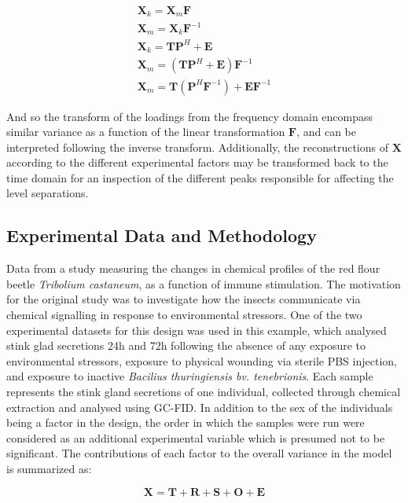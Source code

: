 \documentclass[preprint,12pt]{elsarticle}
\begin{document}
\begin{align}
    \mathbf{X}_k = \mathbf{X}_m\mathbf{F}\\
    \mathbf{X}_m = \mathbf{X}_k\mathbf{F}^{-1}\\
    \mathbf{X}_k = \mathbf{T}\mathbf{P}^H + \mathbf{E}\\
    \mathbf{X}_m = \left(\mathbf{T}\mathbf{P}^H + \mathbf{E}\right)\mathbf{F}^{-1}\\
    \mathbf{X}_m = \mathbf{T}\left(\mathbf{P}^H\mathbf{F}^{-1}\right) + \mathbf{E}\mathbf{F}^{-1}
\end{align}

And so the transform of the loadings from the frequency domain encompass similar variance as a function of the linear transformation $\mathbf{F}$, and can be interpreted following the inverse transform. Additionally, the reconstructions of $\mathbf{X}$ according to the different experimental factors may be transformed back to the time domain for an inspection of the different peaks responsible for affecting the level separations.
 
\subsection{Experimental Data and Methodology}

Data from a study measuring the changes in chemical profiles of the red flour beetle \textit{Tribolium castaneum}, as a function of immune stimulation. The motivation for the original study \cite{lo2023immune} was to investigate how the insects communicate via chemical signalling in response to environmental stressors. One of the two experimental datasets for this design was used in this example, which analysed stink glad secretions 24h and 72h following the absence of any exposure to environmental stressors, exposure to physical wounding via sterile PBS injection, and exposure to inactive \textit{Bacilius thuringiensis bv. tenebrionis}. Each sample represents the stink gland secretions of one individual, collected through chemical extraction and analysed using GC-FID. In addition to the sex of the individuals being a factor in the design, the order in which the samples were run were considered as an additional experimental variable which is presumed not to be significant. The contributions of each factor to the overall variance in the model is summarized as:

\begin{equation}\label{eq:GLM}
    \mathbf{X} = \mathbf{T} + \mathbf{R} + \mathbf{S} + \mathbf{O} + \mathbf{E}
\end{equation}
\end{document}
